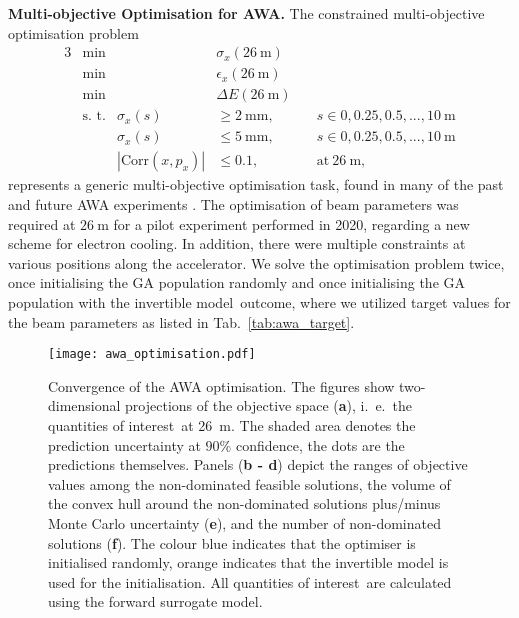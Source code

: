 \documentclass[a4paper, 12pt, version-1-compatibility]{article}
\def\invertiblemodel{invertible model}
\def\qois{quantities of interest}
\begin{document}
{\bf Multi-objective Optimisation for AWA.}
\label{sec:awa_optim}
The constrained multi-objective optimisation problem 
\begin{alignat*}{3}
&\text{min}   &            &\sigma_x(26~\mathrm{m})   &\\
&\text{min}   &            &\epsilon_x(26~\mathrm{m}) &\\
&\mathrm{min} &            &\Delta E(26~\mathrm{m})   &\\
&\text{s.\ t.} &\sigma_x(s) &\geq 2~\mathrm{mm},       &\quad s \in 0, 0.25, 0.5, ..., 10~\mathrm{m}\\
&             &\sigma_x(s) &\leq 5~\mathrm{mm},       &\quad s \in 0, 0.25, 0.5, ..., 10~\mathrm{m}\\
&             &\left| \mathrm{Corr}(x, p_x) \right| &\leq 0.1,         &\quad \mathrm{at~26~m},
\end{alignat*}
represents a generic multi-objective optimisation task, found in many of the past and future AWA experiments \cite{AWAPower}. The optimisation of beam parameters was required at $26~\mathrm{m}$ for a pilot experiment performed in 2020, regarding a new scheme for electron cooling. In addition, there were multiple constraints at various positions along the accelerator.
We solve the optimisation problem twice, once initialising the GA population randomly and once initialising the GA population with the \invertiblemodel\ outcome, where we utilized target values for the beam parameters as listed in Tab.~\ref{tab:awa_target}.
\begin{figure}
    \centering
    \texttt{[image: awa\_optimisation.pdf]}
    \caption{Convergence of the AWA optimisation. The figures show two-dimensional projections of the objective space (\textbf{a}), i.\ e.\ the \qois\ at \SI{26}{m}. The shaded area denotes the prediction uncertainty at $90\%$ confidence, the dots are the predictions themselves. Panels (\textbf{b - d}) depict the ranges of objective values among the non-dominated feasible solutions, the volume of the convex hull around the non-dominated solutions plus/minus Monte Carlo uncertainty (\textbf{e}), and the number of non-dominated solutions (\textbf{f}). The colour blue indicates that the optimiser is initialised randomly, orange indicates that the invertible model is used for the initialisation. All \qois\ are calculated using the forward surrogate model.}
    \label{fig:awa_convergence}
\end{figure}
\end{document}
